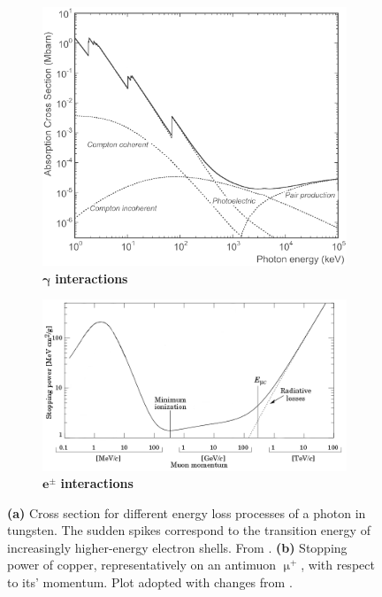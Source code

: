 \begin{figure}
	\begin{subfigure}[b]{0.4\textwidth}
		\centering
		\includegraphics[width=\textwidth]{./plots/photon_cross_section.png}
		\caption{$\mathbf{\gamma}$\textbf{ interactions}}
		\label{fig:gamma-interactions}
	\end{subfigure}
	\hfill
	\begin{subfigure}[b]{0.6\textwidth}
		\centering
		\includegraphics[width=\textwidth]{./plots/electron_ionisation_loss.png}
		\caption{$\mathbf{e^\pm}$\textbf{ interactions}}
		\label{fig:electron-interactions}
	\end{subfigure}
	\caption{\textbf{(a)} Cross section for different energy loss processes of a photon in tungsten. The sudden spikes correspond to the transition energy of 
	increasingly higher-energy electron shells. From \cite{chen2007interactions}. \textbf{(b)} Stopping power of copper, representatively on an antimuon $\upmu^+$, 
	with respect to its' momentum. Plot adopted with changes from \cite{meroli2017straggling}.}
	\label{fig:ionization-losses}
\end{figure}

